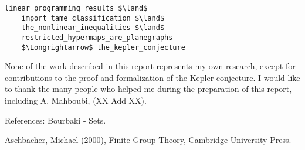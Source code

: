 \documentclass[brochure,english,12pt]{bourbaki}
\theoremstyle{plain}
\begin{document}
\begin{lstlisting}[keepspaces=true,stringstyle=\tt,basicstyle=\small,frame=single,framesep=8pt,framextopmargin=10pt,mathescape,morekeywords={Variable,Theorem,Proof,Qed},columns=flexible,caption={The formal proof of the Kepler conjecture in HOL Light}]
    linear_programming_results $\land$      
    import_tame_classification $\land$      
    the_nonlinear_inequalities $\land$
    restricted_hypermaps_are_planegraphs    
    $\Longrightarrow$ the_kepler_conjecture
\end{lstlisting}


None of the work described in this report represents my own research, except for contributions to the
proof and formalization of the Kepler conjecture.  I would like to thank the many people who helped me
during the preparation of this report, including A. Mahboubi, (XX Add XX).



\raggedright



References: Bourbaki - Sets.

Aschbacher, Michael (2000), Finite Group Theory, Cambridge University Press.
\end{document}

